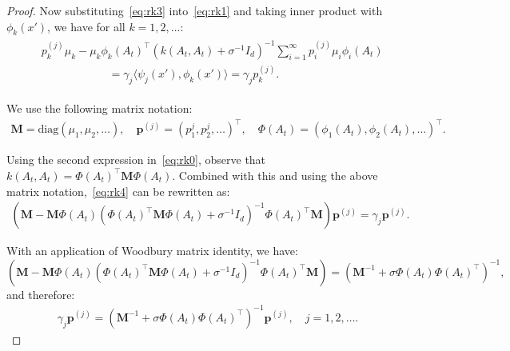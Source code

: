 \documentclass[10pt,a4paper]{amsart}
\begin{document}
\begin{proof}
Now substituting~\eqref{eq:rk3} into~\eqref{eq:rk1} and taking inner product with $\phi_k(x')$, we have for all $k=1,2, \ldots$:
\begin{align}\label{eq:rk4}
\begin{split}
    &p^{(j)}_k \mu_k  - \mu_k \phi_k(A_t)^\top (k(A_t,A_t)+\sigma^{-1} I_d)^{-1} \sum_{i=1}^{\infty} p^{(j)}_i \mu_i \phi_i(A_t)\\
    &\qquad \qquad \qquad = \gamma_j \langle\psi_j(x'),\phi_k(x')\rangle = \gamma_j p^{(j)}_k.
\end{split}
\end{align}

We use the following matrix notation:
\begin{align}
\nonumber
    \mathbf{M}=\text{diag}(\mu_1,\mu_2,\ldots), \quad
        \mathbf{p}^{(j)}= (p^{j}_1,p^{j}_2,\ldots)^\top, \quad
    \Phi(A_t)= (\phi_1(A_t),\phi_2(A_t),\ldots)^\top.
\end{align}

Using the second expression in~\eqref{eq:rk0}, observe that $k(A_t,A_t)=  \Phi(A_t)^\top \mathbf{M} \Phi(A_t)$. Combined with this and using the above matrix notation,~\eqref{eq:rk4} can be rewritten as:
\begin{align}
    \left(\mathbf{M}  - \mathbf{M} \Phi(A_t)(\Phi(A_t)^\top \mathbf{M} \Phi(A_t)+\sigma^{-1} I_d)^{-1}\Phi(A_t)^\top \mathbf{M} \right) \mathbf{p}^{(j)} = \gamma_j \mathbf{p}^{(j)}.
\end{align}

With an application of Woodbury matrix identity, we have: 
$$\left(\mathbf{M}  - \mathbf{M} \Phi(A_t)(\Phi(A_t)^\top \mathbf{M} \Phi(A_t)+\sigma^{-1} I_d)^{-1}\Phi(A_t)^\top \mathbf{M} \right) = (\mathbf{M}^{-1} + \sigma \Phi(A_t)\Phi(A_t)^\top)^{-1},$$ 
and therefore:
\begin{align}
    \gamma_j \mathbf{p}^{(j)} = (\mathbf{M}^{-1} + \sigma \Phi(A_t)\Phi(A_t)^\top)^{-1} \mathbf{p}^{(j)}, \quad j=1,2,\ldots.
    \label{eq:rk5}
\end{align}


\end{proof}
\end{document}
